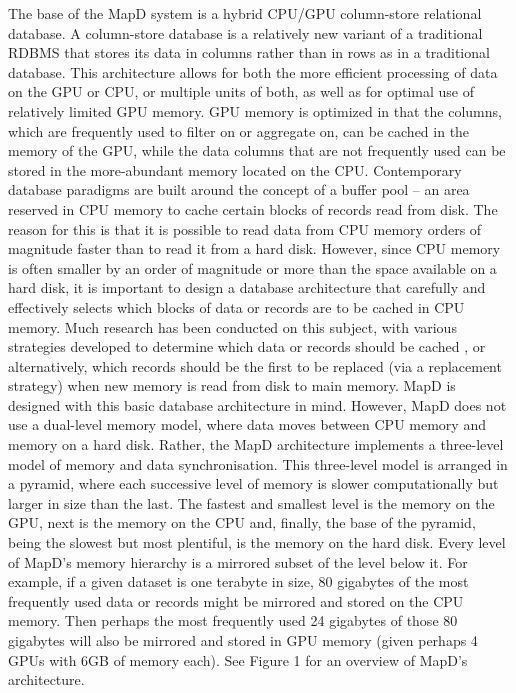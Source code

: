 \documentclass[twocolumn]{article}
\begin{document}
The base of the MapD system is a hybrid CPU/GPU column-store relational database. A column-store database is a relatively new variant of a traditional RDBMS that stores its data in columns rather than in rows as in a traditional database. This architecture allows for both the more efficient processing of data on the GPU or CPU, or multiple units of both, as well as for optimal use of relatively limited GPU memory. GPU memory is optimized in that the columns, which are frequently used to filter on or aggregate on, can be cached in the memory of the GPU, while the data columns that are not frequently used can be stored in the more-abundant memory located on the CPU.
Contemporary database paradigms are built around the concept of a buffer pool – an area reserved in CPU memory to cache certain blocks of records read from disk. The reason for this is that it is possible to read data from CPU memory orders of magnitude faster than to read it from a hard disk. However, since CPU memory is often smaller by an order of magnitude or more than the space available on a hard disk, it is important to design a database architecture that carefully and effectively selects which blocks of data or records are to be cached in CPU memory. Much research has been conducted on this subject, with various strategies developed to determine which data or records should be cached , or alternatively, which records should be the first to be replaced (via a replacement strategy) when new memory is read from disk to main memory.
MapD is designed with this basic database architecture in mind. However, MapD does not use a dual-level memory model, where data moves between CPU memory and memory on a hard disk. Rather, the MapD architecture implements a three-level model of memory and data synchronisation. This three-level model is arranged in a pyramid, where each successive level of memory is slower computationally but larger in size than the last. The fastest and smallest level is the memory on the GPU, next is the memory on the CPU and, finally, the base of the pyramid, being the slowest but most plentiful, is the memory on the hard disk.
Every level of MapD’s memory hierarchy is a mirrored subset of the level below it. For example, if a given dataset is one terabyte in size, 80 gigabytes of the most frequently used data or records might be mirrored and stored on the CPU memory. Then perhaps the most frequently used 24 gigabytes of those 80 gigabytes will also be mirrored and stored in GPU memory (given perhaps 4 GPUs with 6GB of memory each). See Figure 1 for an overview of MapD’s architecture.
\end{document}
